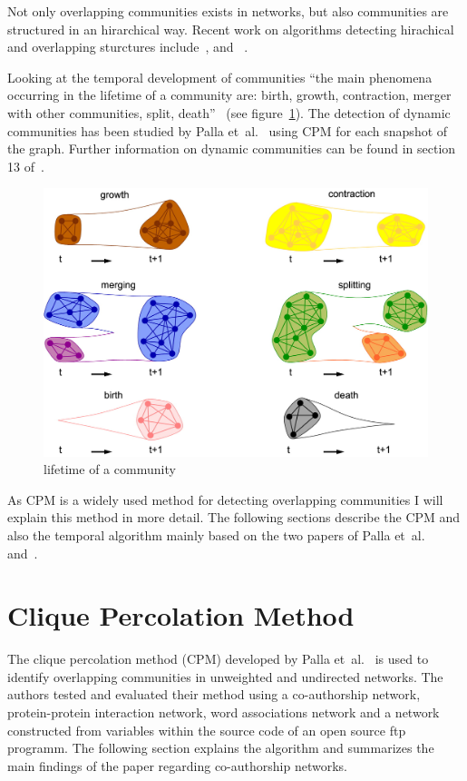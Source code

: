 \documentclass[runningheads,a4paper]{llncs}
\begin{document}
Not only overlapping communities exists in networks, but also communities are structured in an hirarchical way.
Recent work on algorithms detecting hirachical and overlapping sturctures  include~\cite{1367-2630-11-3-033015}, \cite{Cui201485} and~ \cite{Shen20091706}.

Looking at the temporal development of communities ``the main phenomena occurring in the lifetime of a community are: birth, growth, contraction, merger with other communities, split, death''~\cite{fortunato2010community} (see figure~\ref{fig:evolution}).
The detection of dynamic communities has been studied by Palla et~al.~\cite{palla2007quantifying} using CPM for each snapshot of the graph. Further information on dynamic communities can be found in section 13 of~\cite{fortunato2010community}.

\begin{figure}
	\includegraphics[width=\textwidth]{villsize.jpg}
	\caption{lifetime of a community}
	\label{fig:evolution}
\end{figure}

As CPM is a widely used method for detecting overlapping communities I will explain this method in more detail. The following sections describe the CPM and also the temporal algorithm mainly based on the two papers of Palla et~al.~\cite{palla2005uncovering} and~\cite{palla2007quantifying}.

\section{Clique Percolation Method}
\label{cpm}
The clique percolation method (CPM) developed by Palla et~al.~\cite{palla2007quantifying} is used to identify overlapping communities in unweighted and undirected networks.
The authors tested and evaluated their method using a co-authorship network, protein-protein interaction network, word associations network and a network constructed from variables within the source code of an open source ftp programm.
The following section explains the algorithm and summarizes the main findings of the paper regarding co-authorship networks.
\end{document}
